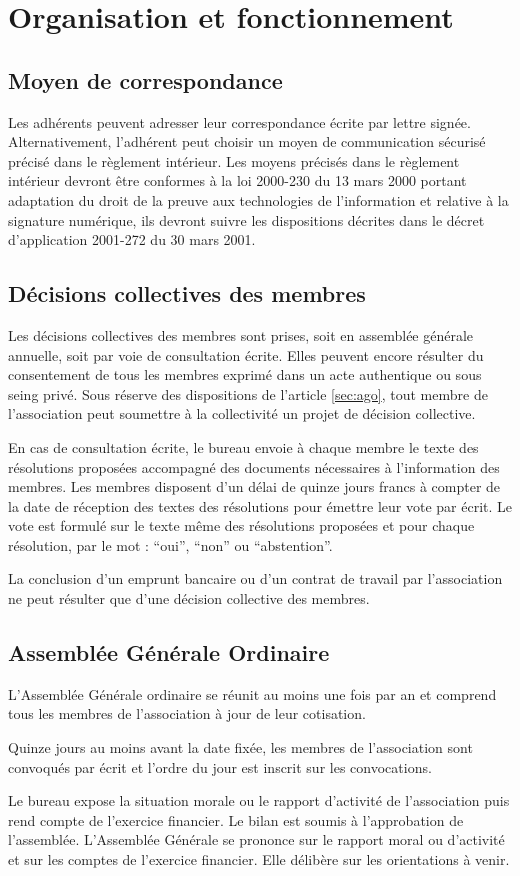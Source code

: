 \documentclass[a4paper,french,10pt]{article}
\newcommand{\article}[1]{\subsection{#1}\addtocounter{article}{1}}
\newcounter{article}
\newcommand{\artref}[1]{article \ref{#1}}
\begin{document}
\section{Organisation et fonctionnement}

\article{Moyen de correspondance}
Les adhérents peuvent adresser leur correspondance écrite par lettre signée. Alternativement, l'adhérent peut choisir un moyen de communication sécurisé précisé dans le règlement intérieur. Les moyens précisés dans le règlement intérieur devront être conformes à la loi 2000-230 du 13 mars 2000 portant adaptation du droit de la preuve aux technologies de l'information et relative à la signature numérique, ils devront suivre les dispositions décrites dans le décret d'application 2001-272 du 30 mars 2001. 

\article{Décisions collectives des membres}
\label{sec:decisions-collectives}

Les décisions collectives des membres sont prises, soit en assemblée
générale annuelle, soit par voie de consultation écrite. Elles peuvent
encore résulter du consentement de tous les membres exprimé dans un
acte authentique ou sous seing privé. Sous réserve des dispositions de
l’\artref{sec:ago}, tout membre de l’association peut soumettre à la
collectivité un projet de décision collective.

En cas de consultation écrite, le bureau envoie à chaque membre le
texte des résolutions proposées accompagné des documents nécessaires à
l’information des membres. Les membres disposent d’un délai de quinze
jours francs à compter de la date de réception des textes des
résolutions pour émettre leur vote par écrit. Le vote est formulé sur
le texte même des résolutions proposées et pour chaque résolution, par
le mot : “oui”, “non” ou “abstention”.

La conclusion d’un emprunt bancaire ou d’un contrat de travail par
l’association ne peut résulter que d’une décision collective des
membres.

\article{Assemblée Générale Ordinaire}
\label{sec:ago}
L’Assemblée Générale ordinaire se réunit au moins une fois par an et
comprend tous les membres de l’association à jour de leur cotisation.

Quinze jours au moins avant la date fixée, les membres de
l’association sont convoqués par écrit et l’ordre du jour est inscrit
sur les convocations.


Le bureau expose la situation morale ou le rapport d'activité de
l'association puis rend compte de l'exercice financier. Le bilan est
soumis à l'approbation de l'assemblée. 
L’Assemblée Générale se prononce sur le rapport moral ou d’activité et
sur les comptes de l’exercice financier. Elle délibère sur les
orientations à venir.
\end{document}
